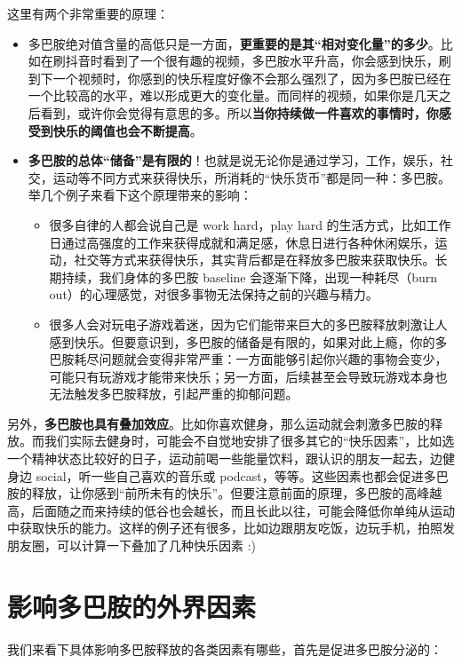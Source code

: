 \documentclass{report}
\begin{document}
这里有两个非常重要的原理：

\begin{itemize}
    \item 多巴胺绝对值含量的高低只是一方面，\textbf{更重要的是其“相对变化量”的多少}。比如在刷抖音时看到了一个很有趣的视频，多巴胺水平升高，你会感到快乐，刷到下一个视频时，你感到的快乐程度好像不会那么强烈了，因为多巴胺已经在一个比较高的水平，难以形成更大的变化量。而同样的视频，如果你是几天之后看到，或许你会觉得有意思的多。所以\textbf{当你持续做一件喜欢的事情时，你感受到快乐的阈值也会不断提高}。
    \item \textbf{多巴胺的总体“储备”是有限的}！也就是说无论你是通过学习，工作，娱乐，社交，运动等不同方式来获得快乐，所消耗的“快乐货币”都是同一种：多巴胺。举几个例子来看下这个原理带来的影响：
    \begin{itemize}
        \item 很多自律的人都会说自己是 work hard，play hard 的生活方式，比如工作日通过高强度的工作来获得成就和满足感，休息日进行各种休闲娱乐，运动，社交等方式来获得快乐，其实背后都是在释放多巴胺来获取快乐。长期持续，我们身体的多巴胺 baseline 会逐渐下降，出现一种耗尽（burn out）的心理感觉，对很多事物无法保持之前的兴趣与精力。
        \item 很多人会对玩电子游戏着迷，因为它们能带来巨大的多巴胺释放刺激让人感到快乐。但要意识到，多巴胺的储备是有限的，如果对此上瘾，你的多巴胺耗尽问题就会变得非常严重：一方面能够引起你兴趣的事物会变少，可能只有玩游戏才能带来快乐；另一方面，后续甚至会导致玩游戏本身也无法触发多巴胺释放，引起严重的抑郁问题。
    \end{itemize}
\end{itemize}

另外，\textbf{多巴胺也具有叠加效应}。比如你喜欢健身，那么运动就会刺激多巴胺的释放。而我们实际去健身时，可能会不自觉地安排了很多其它的“快乐因素”，比如选一个精神状态比较好的日子，运动前喝一些能量饮料，跟认识的朋友一起去，边健身边 social，听一些自己喜欢的音乐或 podcast，等等。这些因素也都会促进多巴胺的释放，让你感到“前所未有的快乐”。但要注意前面的原理，多巴胺的高峰越高，后面随之而来持续的低谷也会越长，而且长此以往，可能会降低你单纯从运动中获取快乐的能力。这样的例子还有很多，比如边跟朋友吃饭，边玩手机，拍照发朋友圈，可以计算一下叠加了几种快乐因素 :)

\section{影响多巴胺的外界因素}

我们来看下具体影响多巴胺释放的各类因素有哪些，首先是促进多巴胺分泌的：
\end{document}
